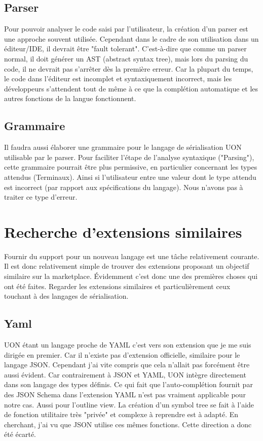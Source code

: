 \documentclass[
    iict, %
    il, %
]{heig-tb}
\begin{document}
\subsection{Parser}
Pour pouvoir analyser le code saisi par l'utilisateur, la création d'un parser est une approche souvent utilisée.
Cependant dans le cadre de son utilisation dans un éditeur/IDE, il devrait être "fault tolerant". C'est-à-dire que comme un parser normal, il doit générer un AST (abstract syntax tree), mais lors du parsing du code, il ne devrait pas s'arrêter dès la première erreur.
Car la plupart du temps, le code dans l'éditeur est incomplet et syntaxiquement incorrect, mais les développeurs s'attendent tout de même à ce que la complétion automatique et les autres fonctions de la langue fonctionnent.


\subsection{Grammaire}
Il faudra aussi élaborer une grammaire pour le langage de sérialisation UON utilisable par le parser.
Pour faciliter l'étape de l'analyse syntaxique ("Parsing"), cette grammaire pourrait être plus permissive, en particulier concernant les types attendus (Terminaux). Ainsi si l'utilisateur entre une valeur dont le type attendu est incorrect (par rapport aux spécifications du langage). Nous n'avons pas à traiter ce type d'erreur.

\section{Recherche d'extensions similaires}
Fournir du support pour un nouveau langage est une tâche relativement courante.
Il est donc relativement simple de trouver des extensions proposant un objectif similaire sur la marketplace.
Évidemment c'est donc une des premières choses qui ont été faites. Regarder les extensions similaires et particulièrement ceux touchant à des langages de sérialisation.

\subsection{Yaml}
UON étant un langage proche de YAML c'est vers son extension que je me suis dirigée en premier. Car il n'existe pas d'extension officielle, similaire pour le langage JSON.
Cependant j'ai vite compris que cela n'allait pas forcément être aussi évident. Car contrairement à JSON et YAML, UON intègre directement dans son langage des types définis. Ce qui fait que l'auto-complétion fournit par des JSON Schema dans l'extension YAML n'est pas vraiment applicable pour notre cas.
Aussi pour l'outline view. La création d'un symbol tree se fait à l'aide de fonction utilitaire très "privée" et complexe à reprendre est à adapté. En cherchant, j'ai vu que JSON utilise ces mêmes fonctions.
Cette direction a donc été écarté.
\end{document}

